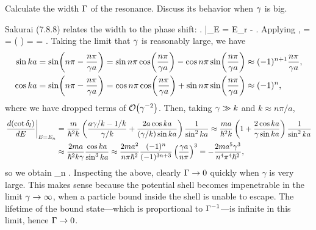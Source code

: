 


\begin{problem}
	Calculate the width $\Gamma$ of the resonance.  Discuss its behavior when $\gamma$ is big.
\end{problem}

\begin{solution}
	Sakurai (7.8.8) relates the width to the phase shift:
	\beq
		\left.  \right|_{E = E_r} \equiv - .
	\eeq
	Applying ,
	\beq
		 =  
		=   \!\left(  \right)
		=  
		=  .
	\eeq
	Taking the limit that $\gamma$ is reasonably large, we have
	\begin{align*}
		\sin ka &= \sin(n\pi - \frac{n\pi}{\gamma a})
		= \sin n\pi \cos(\frac{n\pi}{\gamma a}) - \cos n\pi \sin(\frac{n\pi}{\gamma a})
		\approx (-1)^{n+1} \frac{n\pi}{\gamma a}, \\
		\cos ka &= \sin(n\pi - \frac{n\pi}{\gamma a})
		= \cos n\pi \cos(\frac{n\pi}{\gamma a}) + \sin n\pi \sin(\frac{n\pi}{\gamma a})
		\approx (-1)^n,
	\end{align*}
	where we have dropped terms of $\order{\gam^{-2}}$.  Then, taking $\gamma \gg k$ and $k \approx n\pi / a$,
	\begin{align*}
		\left. \dv{(\cot\delta_l)}{E} \right|_{E = E_n} &= \frac{m}{\hbar^2 k} \left( \frac{a\gamma/k - 1/k}{\gamma/k} + \frac{2 a \cos ka}{(\gamma/k) \sin ka} \right) \frac{1}{\sin^2 ka}
		\approx \frac{m a}{\hbar^2 k} \left( 1 + \frac{2 \cos ka}{\gamma \sin ka} \right) \frac{1}{\sin^2 ka} \\
		&\approx \frac{2 m a}{\hbar^2 k \gamma} \frac{\cos ka}{\sin^3 ka}
		\approx \frac{2 m a^2}{n\pi \hbar^2} \frac{(-1)^n}{(-1)^{3n+3}} \left( \frac{\gamma a}{n\pi} \right)^3
		= -\frac{2 m a^5 \gamma^3}{n^4 \pi^4 \hbar^2},
	\end{align*}
	so we obtain
	\beq
		\Gam_n \approx {}.
	\eeq
	Inspecting the above, clearly $\Gamma \to 0$ quickly when $\gamma$ is very large.  This makes sense because the potential shell becomes impenetrable in the limit $\gamma \to \infty$, when a particle bound inside the shell is unable to escape.  The lifetime of the bound state---which is proportional to $\Gamma^{-1}$---is infinite in this limit, hence $\Gamma \to 0$.
\end{solution}



